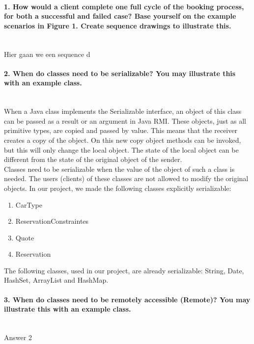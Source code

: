 \documentclass{ds-report}
\begin{document}
	\maketitle

	\paragraph{1. How would a client complete one full cycle of the booking process, for both a successful and
failed case? Base yourself on the example scenarios in Figure 1. Create sequence drawings to
illustrate this.} \mbox{}\\
	Hier gaan we een sequence d
	
	\paragraph{2. When do classes need to be serializable? You may illustrate this with an example class.} \mbox{}\\
When a Java class implements the Serializable interface, an object of this class can be passed as a result or an argument in Java RMI. These objects, just as all primitive types, are copied and passed by value. This means that the receiver creates a copy of the object. On this new copy object methods can be invoked, but this will only change the local object. The state of the local object can be different from the state of the original object of the sender. \\
Classes need to be serializable when the value of the object of such a class is needed. The users (clients) of these classes are not allowed to modify the original objects. In our project, we made the following classes explicitly serializable:
\begin{enumerate}
	\item CarType 
	\item ReservationConstraintes
	\item Quote
	\item Reservation
\end{enumerate}

The following classes, used in our project, are already serializable: String, Date, HashSet, ArrayList and HashMap.

	\paragraph{3. When do classes need to be remotely accessible (Remote)? You may illustrate this with an example
class.} \mbox{}\\
	Answer 2
\end{document}
